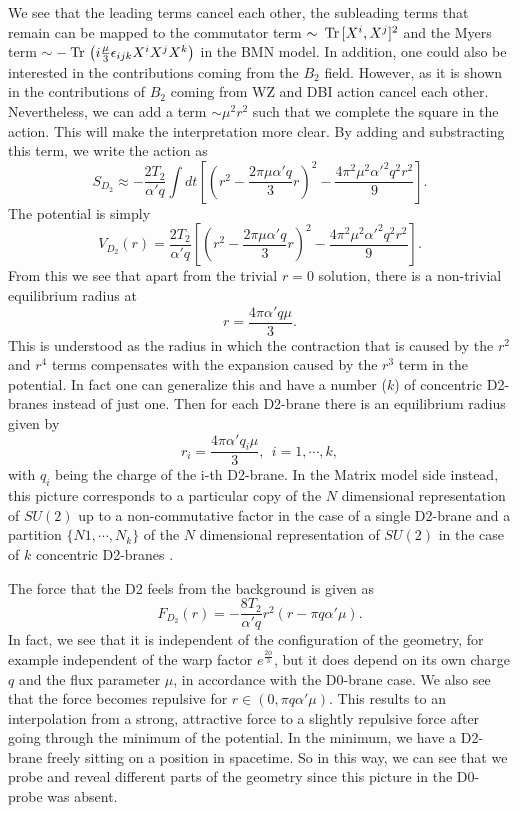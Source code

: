 \documentclass[11pt,english]{article}
\newcommand{\be}{\begin{equation}}
\newcommand{\ee}{\end{equation}}
\newcommand{\Tr}[1]{\:{\rm Tr}\,#1}
\numberwithin{equation}{section}
\begin{document}
We see that the leading terms cancel each other, the subleading terms that remain can be mapped to the  commutator term $\sim\Tr [X^i,X^j]^2$ and the Myers term $\sim-\Tr\left(i\frac{\mu }{3}\epsilon_{ijk}X^iX^jX^k\right)$ in the BMN model. In addition, one could also be interested in the contributions coming from the $B_2$ field. However, as it is shown in \cite{Taylor2000b} the contributions of $B_2$ coming from WZ and DBI action cancel each other. Nevertheless, we can add a term $\sim \mu^2 r^2$ such that we complete the square in the action. This will make the interpretation more clear. By adding and substracting this term, we write the action as  
\be 
S_{D_2}\approx-\frac{2T_2}{\alpha' q}\int dt\left[\left(r^2-\frac{2\pi\mu\alpha' q}{3}r\right)^2-\frac{4\pi^2\mu^2\alpha'^2q^2r^2}{9}\right].
\ee
The potential is simply 
\be 
V_{D_2}(r)=\frac{2T_2}{\alpha' q}\left[\left(r^2-\frac{2\pi\mu\alpha' q}{3}r\right)^2-\frac{4\pi^2\mu^2\alpha'^2q^2r^2}{9}\right].
\ee
From this we see that apart from the trivial $r=0$ solution, there is a non-trivial equilibrium radius at 
\be 
r=\frac{4\pi\alpha'q\mu}{3}.
\ee 
This is understood as the radius in which the contraction that is caused by the $r^2$ and $r^4$ terms compensates with the expansion caused by the $r^3$ term in the potential. In fact one can generalize this and have a number ($k$) of concentric D2-branes instead of just one. Then for each D2-brane there is an equilibrium radius given by 
\be 
r_i=\frac{4\pi\alpha'q_i\mu}{3},~~i=1,\cdots, k,
\ee   
with $q_i$ being the charge of the i-th D2-brane. In the Matrix model side instead, this picture corresponds to a particular copy of the $N$ dimensional representation of $SU(2)$ up to a non-commutative factor in the case of a single D2-brane and a partition $\{N1,\cdots,N_k\}$ of the $N$ dimensional representation of $SU(2)$ in the case of $k$ concentric D2-branes .  

The force that the D2 feels from the background is given as 
\be 
F_{D_2}(r)=-\frac{8T_2}{\alpha' q}r^2(r-\pi q\alpha'\mu).
\ee
In fact, we see that it is independent of the configuration of the geometry, for example independent of the warp factor $e^\frac{2\phi}{3}$, but it does depend on its own charge $q$ and the flux parameter $\mu$, in accordance with the D0-brane case. We also see that the force becomes repulsive for $r\in (0,\pi q\alpha'\mu)$. This results to an interpolation from a strong, attractive force to a slightly repulsive force after going through the minimum of the potential.  In the minimum, we have a D2-brane freely sitting on a position in spacetime. So in this way, we can see that we probe and reveal different parts of the geometry since this picture in the D0-probe was absent. 
\end{document}
